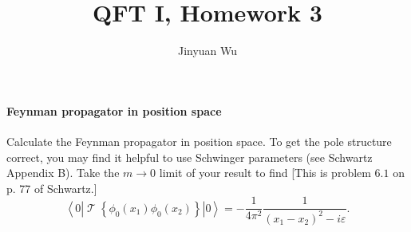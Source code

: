 \documentclass[hyperref, a4paper]{article}
\title{QFT I, Homework 3}
\author{Jinyuan Wu}
\DeclareMathOperator{\timeorder}{\mathcal{T}}
\begin{document}
\maketitle

\paragraph{Feynman propagator in position space} Calculate the Feynman propagator in position space. To get the pole structure correct, you may find it helpful to use Schwinger parameters (see Schwartz Appendix B). Take the $m \rightarrow 0$ limit of your result to find [This is problem $6.1$ on p. 77 of Schwartz.]
\begin{equation}
    \left\langle 0\left|\timeorder\left\{\phi_{0}\left(x_{1}\right) \phi_{0}\left(x_{2}\right)\right\}\right| 0\right\rangle=-\frac{1}{4 \pi^{2}} \frac{1}{\left(x_{1}-x_{2}\right)^{2}-i \varepsilon}.
    \label{eq:massless-propagator}
\end{equation}
\end{document}
